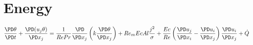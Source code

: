 \documentclass[11pt]{article}
\begin{document}







\section{Energy}
\Large
\begin{equation}
	\frac{\PD \theta}{\PD t} +
	\frac{\PD (u_j \theta)}{\PD x_j}
	=
	\frac{1}{Re Pr}
	\frac{\PD}{\PD x_j}
	\left(
	k \frac{\PD \theta}{\PD x_j}
	\right) +
	Re_m Ec Al
	\frac{{j}^2}{\sigma} +
	\frac{Ec}{Re}
	\left(
	\frac{\PD u_j}{\PD x_i}
	-
	\frac{\PD u_i}{\PD x_j}
	\right)
	\frac{\PD u_i}{\PD x_j} +
	\dot{Q}
\end{equation}
\end{document}
